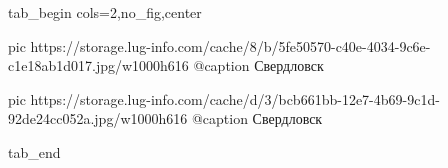  
 
 
 
 


\ifcmt
  tab_begin cols=2,no_fig,center

     pic https://storage.lug-info.com/cache/8/b/5fe50570-c40e-4034-9c6e-c1e18ab1d017.jpg/w1000h616
		 @caption Свердловск

		 pic https://storage.lug-info.com/cache/d/3/bcb661bb-12e7-4b69-9c1d-92de24cc052a.jpg/w1000h616
		 @caption Свердловск

  tab_end
\fi
